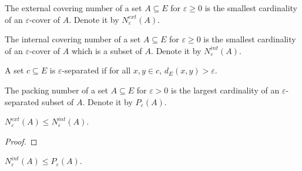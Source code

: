 \begin{definition}\label{def:externalCoveringNumber}
  \mathlibok
  The external covering number of a set $A \subseteq E$ for $\varepsilon \ge 0$ is the smallest cardinality of an $\varepsilon$-cover of $A$.
  Denote it by $N^{ext}_\varepsilon(A)$.
\end{definition}


\begin{definition}\label{def:internalCoveringNumber}
  \mathlibok
  The internal covering number of a set $A \subseteq E$ for $\varepsilon \ge 0$ is the smallest cardinality of an $\varepsilon$-cover of $A$ which is a subset of $A$.
  Denote it by $N^{int}_\varepsilon(A)$.
\end{definition}


\begin{definition}\label{def:IsSeparated}
  \mathlibok
A set $c \subseteq E$ is $\varepsilon$-separated if for all $x, y \in c$, $d_E(x, y) > \varepsilon$.
\end{definition}


\begin{definition}\label{def:packingNumber}
  \mathlibok
The packing number of a set $A \subseteq E$ for $\varepsilon > 0$ is the largest cardinality of an $\varepsilon$-separated subset of $A$.
Denote it by $P_\varepsilon(A)$.
\end{definition}


\begin{lemma}\label{lem:externalCoveringNumber_le_internalCoveringNumber}
  \mathlibok
$N^{ext}_\varepsilon(A) \le N^{int}_\varepsilon(A)$.
\end{lemma}

\begin{proof}\leanok

\end{proof}


\begin{lemma}\label{lem:internalCoveringNumber_le_packingNumber}
  \mathlibok
$N^{int}_\varepsilon(A) \le P_\varepsilon(A)$.
\end{lemma}

